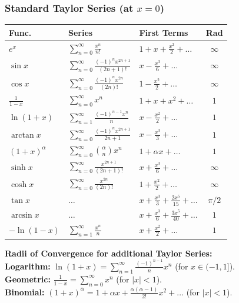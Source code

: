 \subsubsection{Standard Taylor Series (at $x=0$)}
\begin{center}
\scriptsize
\setlength{\tabcolsep}{2pt}
\begin{tabularx}{\columnwidth}{|l|>{\hsize=1.25\hsize\raggedright\arraybackslash}X|>{\hsize=0.75\hsize\raggedright\arraybackslash}X|c|}
\hline
\textbf{Func.} & \textbf{Series} & \textbf{First Terms} & \textbf{Rad} \\ \hline
$e^x$ & $\sum_{n=0}^\infty \frac{x^n}{n!}$ & $1+x+\frac{x^2}{2}+\dots$ & $\infty$ \\ \hline
$\sin x$ & $\sum_{n=0}^\infty \frac{(-1)^n x^{2n+1}}{(2n+1)!}$ & $x-\frac{x^3}{6}+\dots$ & $\infty$ \\ \hline
$\cos x$ & $\sum_{n=0}^\infty \frac{(-1)^n x^{2n}}{(2n)!}$ & $1-\frac{x^2}{2}+\dots$ & $\infty$ \\ \hline
$\frac{1}{1-x}$ & $\sum_{n=0}^\infty x^n$ & $1+x+x^2+\dots$ & $1$ \\ \hline
$\ln(1+x)$ & $\sum_{n=1}^\infty \frac{(-1)^{n-1} x^n}{n}$ & $x-\frac{x^2}{2}+\dots$ & $1$ \\ \hline
$\arctan x$ & $\sum_{n=0}^\infty \frac{(-1)^n x^{2n+1}}{2n+1}$ & $x-\frac{x^3}{3}+\dots$ & $1$ \\ \hline
$(1+x)^\alpha$ & $\sum_{n=0}^\infty \binom{\alpha}{n} x^n$ & $1+\alpha x+\dots$ & $1$ \\ \hline
$\sinh x$ & $\sum_{n=0}^\infty \frac{x^{2n+1}}{(2n+1)!}$ & $x+\frac{x^3}{6}+\dots$ & $\infty$ \\ \hline
$\cosh x$ & $\sum_{n=0}^\infty \frac{x^{2n}}{(2n)!}$ & $1+\frac{x^2}{2}+\dots$ & $\infty$ \\ \hline
$\tan x$ & $\dots$ & $x + \frac{x^3}{3} + \frac{2x^5}{15} +\dots$ & $\pi/2$ \\ \hline
$\arcsin x$ & $\dots$ & $x + \frac{x^3}{6} + \frac{3x^5}{40} +\dots$ & $1$ \\ \hline
$-\ln(1-x)$ & $\sum_{n=1}^\infty \frac{x^n}{n}$ & $x + \frac{x^2}{2} + \dots$ & $1$ \\ \hline
\end{tabularx}
\end{center}

\begin{important}
    \textbf{Radii of Convergence for additional Taylor Series:} \\
    \textbf{Logarithm:} $\ln(1+x) = \sum_{n=1}^\infty \frac{(-1)^{n-1}}{n} x^n$ (for $x \in (-1, 1]$). \\
    \textbf{Geometric:} $\frac{1}{1-x} = \sum_{n=0}^\infty x^n$ (for $|x| < 1$). \\
    \textbf{Binomial:} $(1+x)^\alpha = 1 + \alpha x + \frac{\alpha(\alpha-1)}{2!} x^2 + \dots$ (for $|x| < 1$).
\end{important}


